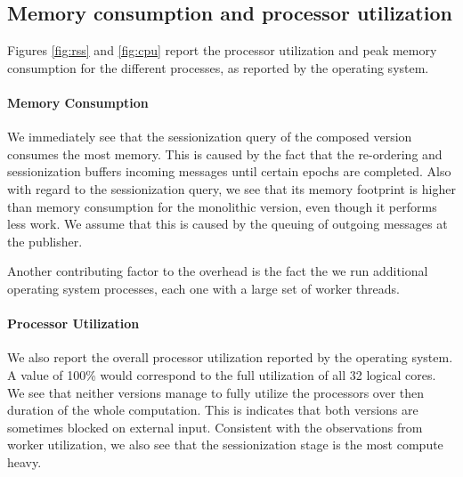 \subsection{Memory consumption and processor utilization}

Figures \ref{fig:rss} and \ref{fig:cpu} report the processor utilization and peak
memory consumption for the different processes, as reported by the operating
system.

\paragraph{Memory Consumption}

We immediately see that the sessionization query of the composed version
consumes the most memory. This is caused by the fact that the re-ordering
and sessionization buffers incoming messages until certain epochs are completed.
Also with regard to the sessionization query, we see that its memory footprint
is higher than memory consumption for the monolithic version, even though
it performs less work. We assume that this is caused by the queuing of
outgoing messages at the publisher.

Another contributing factor to the overhead is the fact the we run additional
operating system processes, each one with a large set of worker threads.


\paragraph{Processor Utilization}

We also report the overall processor utilization reported by the operating system.
A value of 100\% would correspond to the full utilization of all 32 logical cores.
We see that neither versions manage to fully utilize the processors over then duration of
the whole computation. This is indicates that both versions are sometimes blocked
on external input. Consistent with the observations from worker utilization, we
also see that the sessionization stage is the most compute heavy.

